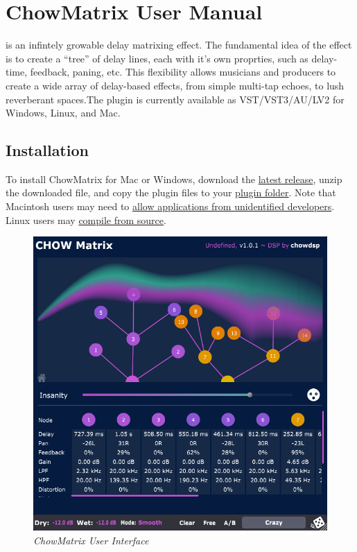 \documentclass[landscape,twocolumn,a5paper]{manual}
\def\pluginfolder{\href{https://help.uaudio.com/hc/en-us/articles/210216306-Default-Install-Locations-for-UAD-Plug-Ins}{plugin folder}}
\def\dllink#1{\href{https://github.com/jatinchowdhury18/AnalogTapeModel/releases}{#1}}
\begin{document}
\section{ChowMatrix User Manual}

\noindent
{} is an infintely growable delay
matrixing effect. The fundamental idea of the effect is
to create a ``tree'' of delay lines, each with it's own
proprties, such as delay-time, feedback, paning, etc.
This flexibility allows musicians and producers to create
a wide array of delay-based effects, from simple multi-tap
echoes, to lush reverberant spaces.The plugin is currently
available as VST/VST3/AU/LV2 for Windows, Linux, and Mac.

\subsection{Installation}
To install ChowMatrix for Mac or Windows, download the
\dllink{latest release}, unzip the downloaded file, and copy
the plugin files to your \pluginfolder. Note that Macintosh
users may need to
\href{https://www.imore.com/how-open-apps-anywhere-macos-catalina-and-mojave}{allow applications from unidentified developers}.
Linux users may 
\href{https://github.com/Chowdhury-DSP/ChowMatrix#Building}{compile from source}.

\begin{figure}[ht]
    \center
    \includegraphics[width=0.75\columnwidth]{screenshots/full_gui.png}
    \caption{\label{fig:full_gui}{\it ChowMatrix User Interface}}
\end{figure}
\end{document}
